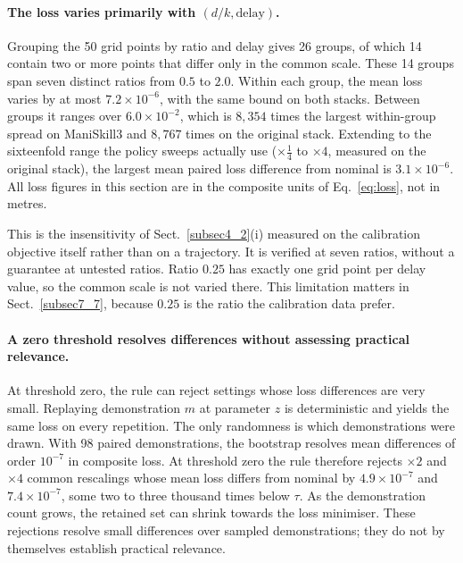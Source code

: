 \documentclass[pdflatex,iicol,sn-apa]{sn-jnl}
\theoremstyle{remark}
\begin{document}
\paragraph{The loss varies primarily with $(d/k, \text{delay})$.}
Grouping the 50 grid points by ratio and delay gives 26 groups, of which 14 contain two or more
points that differ only in the common scale. These 14 groups span seven distinct ratios from
$0.5$ to $2.0$. Within each group, the mean loss varies by at most $7.2\times10^{-6}$,
with the same bound on both stacks. Between groups it ranges over $6.0\times10^{-2}$, which is $8{,}354$ times the
largest within-group spread on ManiSkill3 and $8{,}767$ times on the original stack. Extending to
the sixteenfold range the policy sweeps actually use ($\times\tfrac14$ to $\times 4$, measured on
the original stack), the largest mean paired loss difference from nominal is $3.1\times10^{-6}$.
All loss figures in this section are in the composite units of Eq.~\eqref{eq:loss}, not in metres.

This is the insensitivity of Sect.~\ref{subsec4_2}(i) measured on the calibration objective itself
rather than on a trajectory. It is verified at seven ratios, without a guarantee at untested ratios. Ratio $0.25$ has exactly
one grid point per delay value, so the common scale is not varied there. This limitation matters in
Sect.~\ref{subsec7_7}, because $0.25$ is the ratio the calibration data prefer.

\paragraph{A zero threshold resolves differences without assessing practical relevance.}
At threshold zero, the rule can reject settings whose loss differences are very small.
Replaying demonstration $m$ at parameter $z$ is deterministic and yields the same loss on every
repetition. The only randomness is which demonstrations were drawn. With 98 paired
demonstrations, the bootstrap resolves mean differences of order $10^{-7}$ in composite loss. At
threshold zero the rule therefore rejects $\times 2$ and $\times 4$ common rescalings whose
mean loss differs from nominal by $4.9\times10^{-7}$ and $7.4\times10^{-7}$, some two to three
thousand times below $\tau$. As the demonstration count grows, the retained
set can shrink towards the loss minimiser. These rejections resolve small differences over sampled
demonstrations; they do not by themselves establish practical relevance.
\end{document}
